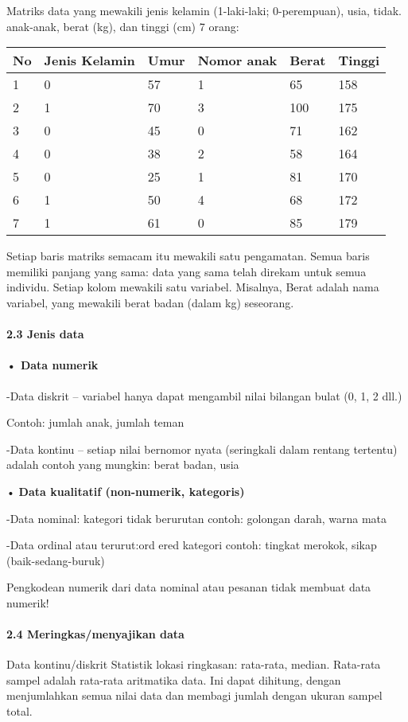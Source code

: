 \documentclass[
]{article}
\begin{document}
Matriks data yang mewakili jenis kelamin (1-laki-laki; 0-perempuan),
usia, tidak. anak-anak, berat (kg), dan tinggi (cm) 7 orang:

\begin{longtable}[]{@{}llllll@{}}
\toprule()
No & Jenis Kelamin & Umur & Nomor anak & Berat & Tinggi \\
\midrule()
\endhead
1 & 0 & 57 & 1 & 65 & 158 \\
2 & 1 & 70 & 3 & 100 & 175 \\
3 & 0 & 45 & 0 & 71 & 162 \\
4 & 0 & 38 & 2 & 58 & 164 \\
5 & 0 & 25 & 1 & 81 & 170 \\
6 & 1 & 50 & 4 & 68 & 172 \\
7 & 1 & 61 & 0 & 85 & 179 \\
\bottomrule()
\end{longtable}

Setiap baris matriks semacam itu mewakili satu pengamatan. Semua baris
memiliki panjang yang sama: data yang sama telah direkam untuk semua
individu. Setiap kolom mewakili satu variabel. Misalnya, Berat adalah
nama variabel, yang mewakili berat badan (dalam kg) seseorang.

\hypertarget{jenis-data}{%
\paragraph{\texorpdfstring{\textbf{2.3 Jenis
data}}{2.3 Jenis data}}\label{jenis-data}}

\hypertarget{data-numerik}{%
\paragraph{\texorpdfstring{• \textbf{Data
numerik}}{• Data numerik}}\label{data-numerik}}

-Data diskrit -- variabel hanya dapat mengambil nilai bilangan bulat (0,
1, 2 dll.)

Contoh: jumlah anak, jumlah teman

-Data kontinu -- setiap nilai bernomor nyata (seringkali dalam rentang
tertentu) adalah contoh yang mungkin: berat badan, usia

• \textbf{Data kualitatif (non-numerik, kategoris)}

-Data nominal: kategori tidak berurutan contoh: golongan darah, warna
mata

-Data ordinal atau terurut:ord ered kategori contoh: tingkat merokok,
sikap (baik-sedang-buruk)

Pengkodean numerik dari data nominal atau pesanan tidak membuat data
numerik!

\hypertarget{meringkasmenyajikan-data}{%
\paragraph{\texorpdfstring{\textbf{2.4 Meringkas/menyajikan
data}}{2.4 Meringkas/menyajikan data}}\label{meringkasmenyajikan-data}}

Data kontinu/diskrit Statistik lokasi ringkasan: rata-rata, median.
Rata-rata sampel adalah rata-rata aritmatika data. Ini dapat dihitung,
dengan menjumlahkan semua nilai data dan membagi jumlah dengan ukuran
sampel total.
\end{document}
